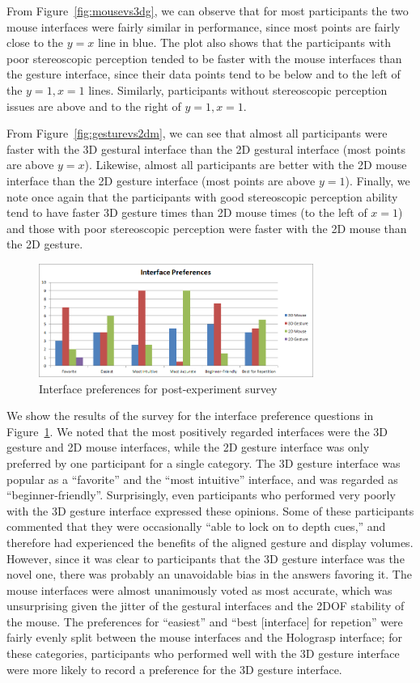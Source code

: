 \documentclass[pageno]{jpaper}
\begin{document}
From Figure~\ref{fig:mousevs3dg}, we can observe that for most participants
the two mouse interfaces were fairly similar in performance, since most points
are fairly close to the $y = x$ line in blue. The plot also shows that the
participants with poor stereoscopic perception tended to be faster with the
mouse interfaces than the gesture interface, since their data points tend to be below
and to the left of the $y = 1, x = 1$ lines. Similarly, participants without
stereoscopic perception issues are above and to the right of $y = 1, x = 1$.

From Figure~\ref{fig:gesturevs2dm}, we can see that almost all participants were
faster with the 3D gestural interface than the 2D gestural interface (most
points are above $y = x$). Likewise, almost all participants are better with the
2D mouse interface than the 2D gesture interface (most points are above $y=1$).
Finally, we note once again that the participants with good stereoscopic
perception ability tend to have faster 3D gesture times than 2D mouse times (to
the left of $x=1$) and those with poor stereoscopic perception were faster with
the 2D mouse than the 2D gesture.

\begin{figure}[h]
\centering
\includegraphics[width=0.8\textwidth]{figures/survey.png}
\caption{Interface preferences for post-experiment survey}
\label{fig:survey}
\end{figure}

We show the results of the survey for the interface preference questions in
Figure~\ref{fig:survey}. We noted that the most positively regarded interfaces were the 3D gesture and 2D mouse interfaces, while the
2D gesture interface was only preferred by one participant for a single category. The 3D gesture interface was popular as a ``favorite'' and the ``most intuitive''
interface, and was regarded as ``beginner-friendly''. Surprisingly, even participants who performed very poorly with the 3D gesture interface expressed these opinions.
Some of these participants commented that they were occasionally ``able to lock on to depth cues,'' and therefore had experienced the benefits of the aligned gesture
and display volumes. However, since it was clear to participants that the 3D gesture interface was the novel one, there was probably an unavoidable bias in the answers favoring it.
The mouse interfaces were almost unanimously voted as most accurate, which was unsurprising given the jitter of the gestural interfaces and the
2DOF stability of the mouse. The preferences for ``easiest'' and ``best [interface] for repetion'' were fairly evenly split between the mouse interfaces and the Holograsp
interface; for these categories, participants who performed well with the 3D gesture interface were more likely to record a preference for the 3D gesture interface.
\end{document}

